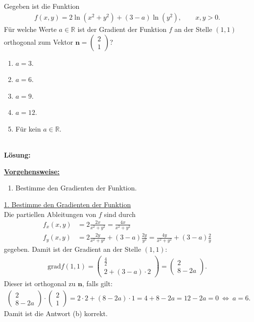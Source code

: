 \subsection*{}
Gegeben ist die Funktion 
\begin{align*}
	f(x,y) = 2 \ln(x^2 +y^2 ) + (3-a) \ln(y^2), \qquad x,y > 0.
\end{align*}
Für welche Werte $ a \in \mathbb{R} $ ist der Gradient der Funktion $ f $ an der Stelle $ (1,1)  $ orthogonal zum Vektor $ \textbf{n} = \begin{pmatrix}2 \\ 1 \end{pmatrix} $?
\renewcommand{\labelenumi}{(\alph{enumi})}
\begin{enumerate}
	\item 
	$ a= 3 $.
	\item 
	$ a= 6 $.
	\item
	$ a= 9 $.
	\item
	$ a= 12 $.
	\item
	Für kein $ a \in \mathbb{R} $.
\end{enumerate}
\ \\
\textbf{Lösung:}
\begin{mdframed}
\underline{\textbf{Vorgehensweise:}}
\renewcommand{\labelenumi}{\theenumi.}
\begin{enumerate}
\item Bestimme den Gradienten der Funktion.
\end{enumerate}
\end{mdframed}

\underline{1. Bestimme den Gradienten der Funktion}\\
Die partiellen Ableitungen von $ f $ sind durch
\begin{align*}
	f_x(x,y) 
	&= 
	2\frac{2x}{x^2 +y^2}
	=
	\frac{4x}{x^2 +y^2}
	\\
	f_y(x,y)
	&=
	2\frac{2y}{x^2 +y^2}
	+
	(3-a) \frac{2y}{y^2} 
	=
	\frac{4y}{x^2 +y^2}+
	(3-a) \frac{2}{y} 
\end{align*}
gegeben. Damit ist der Gradient an der Stelle $ (1,1) $:
\begin{align*}
	\mathrm{grad} f(1,1)
	=
	\begin{pmatrix}
		\frac{4}{2}\\
		2 + (3-a)\cdot 2
	\end{pmatrix}
	=
	\begin{pmatrix}
		2\\
		8 - 2a
	\end{pmatrix}.
\end{align*}
Dieser ist orthogonal zu $ \textbf{n} $, falls gilt:
\begin{align*}
	\begin{pmatrix}
		2\\
		8 - 2 a
	\end{pmatrix}
	\cdot
	\begin{pmatrix}
		2\\
		1
	\end{pmatrix}
	=
	2 \cdot 2 +  (8-2a) \cdot 1
	=
	4 +8  - 2a 
	=12 - 2a = 0
	\ \Leftrightarrow \
	a = 6.
\end{align*}
Damit ist die Antwort (b) korrekt.
\newpage

